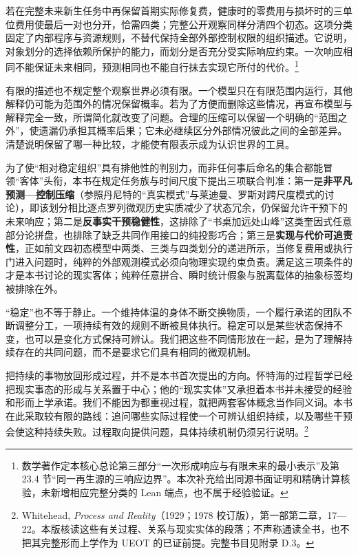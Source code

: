 \documentclass[
  11pt,
  oneside]{book}
\begin{document}
若在完整未来新生任务中再保留首期实际修复费，健康时的零费用与损坏时的三单位费用使最后一对也分开，恰需四类；完整公开观察同样分清四个初态。这项分类固定了内部程序与资源规则，不替代保持全部外部控制权限的组织描述。它说明，对象划分的选择依赖所保护的能力，而划分是否充分受实际响应约束。一次响应相同不能保证未来相同，预测相同也不能自行抹去实现它所付的代价。\footnote{\hypertarget{ph-note-5}{}数学著作定本核心总论第三部分``一次形成响应与有限未来的最小表示''及第 23.4 节``同一再生源的三响应边界''。本次补充给出同源书面证明和精确计算核验，未新增相应完整分类的 Lean 端点，也不属于经验验证。}

有限的描述也不规定整个观察世界必须有限。一个模型只在有限范围内运行，其他解释仍可能为范围外的情况保留概率。若为了方便而删除这些情况，再宣布模型与解释完全一致，所谓简化就改变了问题。合理的压缩可以保留一个明确的``范围之外''，使遗漏仍承担其概率后果；它未必继续区分外部情况彼此之间的全部差异。清楚说明保留了哪一种比较，才能使有限表示成为认识世界的工具。

为了使``相对稳定组织''具有排他性的判别力，而非任何事后命名的集合都能冒领``客体''头衔，本书在规定任务族与时间尺度下提出三项联合判准：第一是\textbf{非平凡预测---控制压缩}（参照丹尼特的``真实模式''与莱迪曼、罗斯对跨尺度模式的讨论），即该划分相比逐点罗列微观历史实质减少了状态冗余，仍保留允许干预下的未来响应；第二是\textbf{反事实干预稳健性}，这排除了``书桌加远处山峰''这类奎因式任意部分论拼盘，也排除了缺乏共同作用接口的纯投影巧合；第三是\textbf{实现与代价可追责性}，正如前文四初态模型中两类、三类与四类划分的递进所示，当修复费用或执行门进入问题时，纯粹的外部观测模式必须向物理实现约束负责。满足这三项条件的才是本书讨论的现实客体；纯粹任意拼合、瞬时统计假象与脱离载体的抽象标签均被排除在外。

``稳定''也不等于静止。一个维持体温的身体不断交换物质，一个履行承诺的团队不断调整分工，一项持续有效的规则不断被具体执行。稳定可以是某些状态保持不变，也可以是变化方式保持可辨认。我们把这些不同情形放在一起，是为了理解持续存在的共同问题，而不是要求它们具有相同的微观机制。

把持续的事物放回形成过程，并不是本书首次提出的方向。怀特海的过程哲学已经把现实事态的形成与关系置于中心；他的``现实实体''又承担着本书并未接受的经验和形而上学承诺。我们不能因为都重视过程，就把两套客体概念当作同义词。本书在此采取较有限的路线：追问哪些实际过程使一个可辨认组织持续，以及哪些干预会使这种持续失败。过程取向提供问题，具体持续机制仍须另行说明。\footnote{\hypertarget{ph-note-6}{}Whitehead, \emph{Process and Reality}（1929；1978 校订版），第一部第二章，17---22。本版核读这些有关过程、关系与现实实体的段落；不声称通读全书，也不把其完整形而上学作为 UEOT 的已证前提。完整书目见附录 D.3。}
\end{document}
